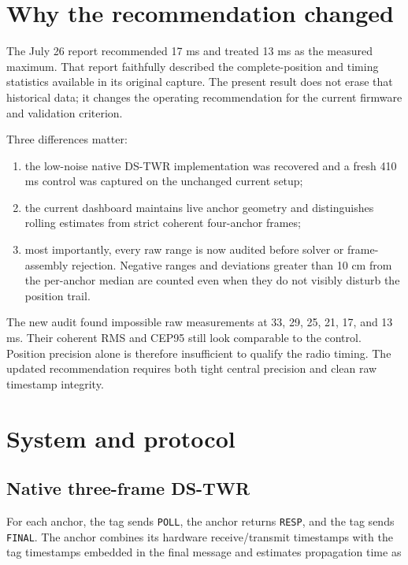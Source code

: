 \documentclass[11pt,a4paper]{article}
\newcommand{\dstwr}{DS-TWR}
\begin{document}
\section{Why the recommendation changed}

The July 26 report recommended 17 ms and treated 13 ms as the measured
maximum. That report faithfully described the complete-position and timing
statistics available in its original capture. The present result does not
erase that historical data; it changes the operating recommendation for the
current firmware and validation criterion.

Three differences matter:

\begin{enumerate}[leftmargin=8mm]
  \item the low-noise native \dstwr{} implementation was recovered and a fresh
  410 ms control was captured on the unchanged current setup;
  \item the current dashboard maintains live anchor geometry and distinguishes
  rolling estimates from strict coherent four-anchor frames;
  \item most importantly, every raw range is now audited before solver or
  frame-assembly rejection. Negative ranges and deviations greater than
  10 cm from the per-anchor median are counted even when they do not visibly
  disturb the position trail.
\end{enumerate}

The new audit found impossible raw measurements at 33, 29, 25, 21, 17, and
13 ms. Their coherent RMS and CEP95 still look comparable to the control.
Position precision alone is therefore insufficient to qualify the radio
timing. The updated recommendation requires both tight central precision and
clean raw timestamp integrity.

\section{System and protocol}

\subsection{Native three-frame DS-TWR}

For each anchor, the tag sends \texttt{POLL}, the anchor returns
\texttt{RESP}, and the tag sends \texttt{FINAL}. The anchor combines its
hardware receive/transmit timestamps with the tag timestamps embedded in the
final message and estimates propagation time as
\end{document}
